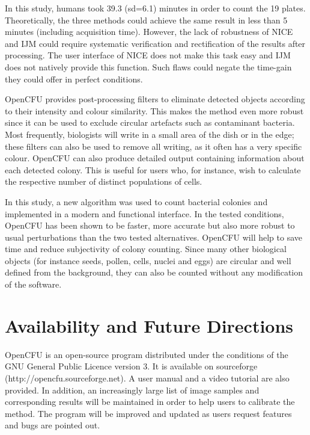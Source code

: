 \documentclass[10pt]{article}
\newcommand{\website}{http://opencfu.sourceforge.net}
\newcommand{\humantime}{39.3 (sd=6.1)}
\newcommand{\IJM}{IJM}
\begin{document}
In this study, humans took \humantime{} minutes in order to count the 19 plates.
Theoretically, the three methods could achieve the same result in less
than 5 minutes (including acquisition time). However, the lack of robustness of
NICE and \IJM{} could require systematic verification and
rectification of the results after processing. The user interface of NICE does not make this task easy and \IJM{} does not natively
provide this function. Such flaws could negate the time-gain they
could offer in perfect conditions.

 

OpenCFU provides post-processing filters to eliminate detected
objects according to their intensity and colour similarity. This makes the method
even more robust since it can be used to exclude circular artefacts such as
contaminant bacteria. Most frequently, biologists will write in a small area of
the dish or in the edge; these filters can also be used to remove all writing, as it often has a very specific colour.
OpenCFU can also produce detailed output containing information about each detected
colony. This is useful for users who, for instance, wish to calculate the
respective number of distinct populations of cells.

In this study, a new algorithm was used to count bacterial colonies and
implemented in a modern and functional interface. In the tested conditions,
OpenCFU has been shown to be faster, more accurate but
also more robust to usual perturbations than the two tested alternatives.
OpenCFU will help to save time and reduce subjectivity of colony
counting. Since many other biological objects (for instance seeds, pollen, cells,
nuclei and eggs) are circular and well defined from the background, they 
{can}
also be counted without any modification of the software.

\section*{Availability and Future Directions}
OpenCFU is an open-source program distributed under the conditions of the GNU
General Public Licence version 3. It is available on sourceforge (\website{}). A
user manual and a video tutorial are also provided. In addition, an increasingly large list
of image samples and corresponding results will be maintained in order 
to 
help users to calibrate the method. 
The program will be improved
and updated as users request features and bugs are pointed out.
\end{document}
